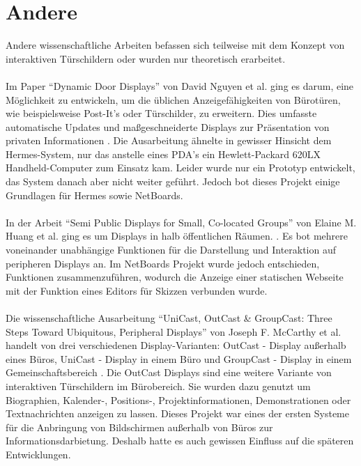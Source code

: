 \section{Andere}
Andere wissenschaftliche Arbeiten befassen sich teilweise mit dem Konzept von interaktiven Türschildern oder wurden nur theoretisch erarbeitet.
\\\\
Im Paper ``Dynamic Door Displays'' von David Nguyen et al. ging es darum, eine Möglichkeit zu entwickeln, um die üblichen Anzeigefähigkeiten von Bürotüren, wie beispielsweise Post-It's oder Türschilder, zu erweitern. Dies umfasste automatische Updates und maßgeschneiderte Displays zur Präsentation von privaten Informationen \cite{nguyen:dyn-door-disp}. Die Ausarbeitung ähnelte in gewisser Hinsicht dem Hermes-System, nur das anstelle eines PDA's ein Hewlett-Packard 620LX Handheld-Computer zum Einsatz kam.
Leider wurde nur ein Prototyp entwickelt, das System danach aber nicht weiter geführt. Jedoch bot dieses Projekt einige Grundlagen für Hermes sowie NetBoards.
\\\\
In der Arbeit ``Semi Public Displays for Small, Co-located Groups'' von Elaine M. Huang et al. ging es um Displays in halb öffentlichen Räumen. . Es bot mehrere voneinander unabhängige Funktionen für die Darstellung und Interaktion auf peripheren Displays an. Im NetBoards Projekt wurde jedoch entschieden, Funktionen zusammenzuführen, wodurch \bspw die Anzeige einer statischen Webseite mit der Funktion eines Editors für Skizzen verbunden wurde.
\\\\
Die wissenschaftliche Ausarbeitung ``UniCast, OutCast \& GroupCast: Three Steps Toward Ubiquitous, Peripheral Displays'' von Joseph F. McCarthy et al. handelt von drei verschiedenen Display-Varianten: OutCast - Display außerhalb eines Büros, UniCast - Display in einem Büro und GroupCast - Display in einem Gemeinschaftsbereich \cite{mccarthy:2001}. Die OutCast Displays sind eine weitere Variante von interaktiven Türschildern im Bürobereich. Sie wurden dazu genutzt um Biographien, Kalender-, Positions-, Projektinformationen, Demonstrationen oder Textnachrichten anzeigen zu lassen. Dieses Projekt war eines der ersten Systeme für die Anbringung von Bildschirmen außerhalb von Büros zur Informationsdarbietung. Deshalb hatte es auch gewissen Einfluss auf die späteren Entwicklungen.
